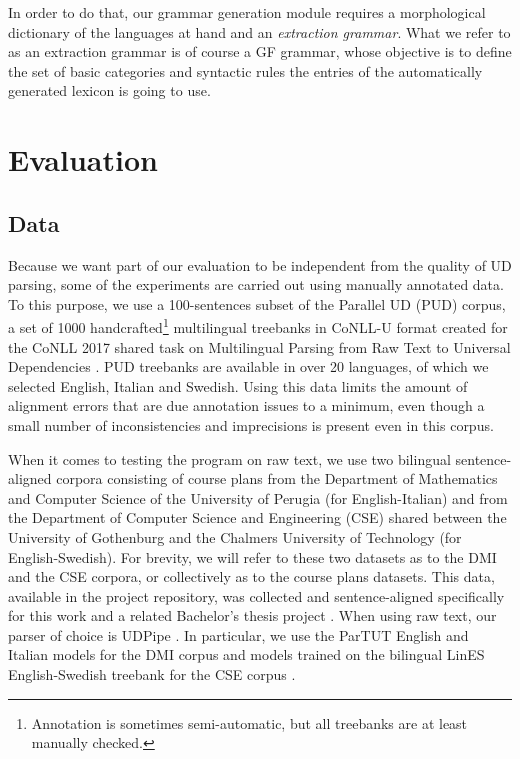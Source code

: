 \documentclass[11pt]{article}
\begin{document}
In order to do that, our grammar generation module requires a morphological dictionary of the languages at hand and an \textit{extraction grammar}. 
What we refer to as an extraction grammar is of course a GF grammar, whose objective is to define the set of basic categories and syntactic rules the entries of the automatically generated lexicon is going to use.


\section{Evaluation} \label{evaluation}
\subsection{Data}
Because we want part of our evaluation to be independent from the quality of UD parsing, some of the experiments are carried out using manually annotated data. 
To this purpose, we use a 100-sentences subset of the Parallel UD (PUD) corpus, a set of 1000 handcrafted\footnote{Annotation is sometimes semi-automatic, but all treebanks are at least manually checked.} multilingual treebanks in CoNLL-U format created for the CoNLL 2017 shared task on Multilingual Parsing from Raw Text to Universal Dependencies \cite{TODO:}.
PUD treebanks are available in over 20 languages, of which we selected English, Italian and Swedish. 
Using this data limits the amount of alignment errors that are due annotation issues to a minimum, even though a small number of inconsistencies and imprecisions is present even in this corpus.

When it comes to testing the program on raw text, we use two bilingual sentence-aligned corpora consisting of course plans from the Department of Mathematics and Computer Science of the University of Perugia (for English-Italian) and from the Department of Computer Science and Engineering (CSE) shared between the University of Gothenburg and the Chalmers University of Technology (for English-Swedish). 
For brevity, we will refer to these two datasets as to the DMI and the CSE corpora, or collectively as to the course plans datasets.
This data, available in the project repository, was collected and sentence-aligned specifically for this work and a related Bachelor's thesis project \cite{TODO:}.
When using raw text, our parser of choice is UDPipe \cite{TODO:}. 
In particular, we use the ParTUT English and Italian models for the DMI corpus and models trained on the bilingual LinES English-Swedish treebank for the CSE corpus \cite{TODO:}.
\end{document}
